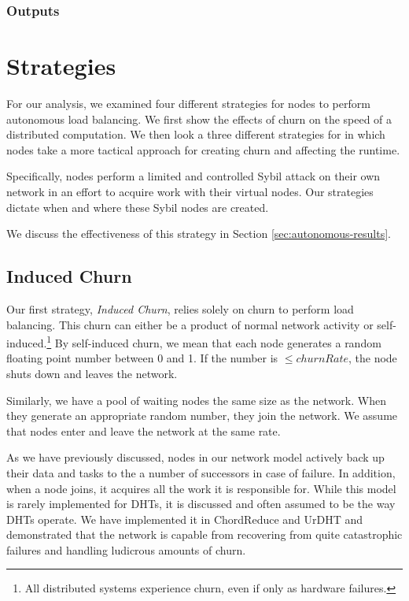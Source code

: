\subsubsection{Outputs}



\section{Strategies}
\label{sec:strategies}

For our analysis, we examined four different strategies for nodes to perform autonomous load balancing.
We first show the effects of churn on the speed of a distributed computation.
We then look a three different strategies for in which nodes take a more tactical approach for creating churn and affecting the runtime.

Specifically, nodes perform a limited and controlled Sybil attack \cite{sybil} on their own network in an effort to acquire work with their virtual nodes.
Our strategies dictate when and where these Sybil nodes are created.

We discuss the effectiveness of this strategy in Section \ref{sec:autonomous-results}.



\subsection{Induced Churn}
Our first strategy, \textit{Induced Churn}, relies solely on churn to perform load balancing.
This churn can either be a product of normal network activity or self-induced.\footnote{All distributed systems experience churn, even if only as hardware failures.}
By self-induced churn, we mean that each node generates a random floating point number between 0 and 1.
If the number is $\leq churnRate$, the node shuts down and leaves the network.

Similarly, we have a pool of waiting nodes the same size as the network.
When they generate an appropriate random number, they join the network.
We assume that nodes enter and leave the network at the same rate.


As we have previously discussed, nodes in our network model actively back up their data and tasks to the a number of successors in case of failure.
In addition, when a node joins, it acquires all the work it is responsible for.
While this model is rarely implemented for DHTs, it is discussed \cite{kademlia} and often assumed to be the way DHTs operate. 
We have implemented it in ChordReduce\cite{chordreduce} and UrDHT\cite{urdht} and demonstrated that the network is capable from recovering from quite catastrophic failures and handling ludicrous amounts of churn.

